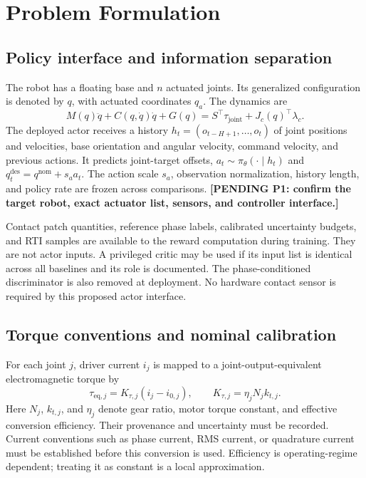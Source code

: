 \documentclass[11pt,a4paper]{article}
\newcommand{\pending}[1]{\textbf{[PENDING #1]}}
\begin{document}
\section{Problem Formulation}
\subsection{Policy interface and information separation}
The robot has a floating base and $n$ actuated joints. Its generalized configuration is denoted by $q$, with actuated coordinates $q_a$. The dynamics are
\begin{equation}
 M(q)\ddot q+C(q,\dot q)\dot q+G(q)=S^\top\tau_{\mathrm{joint}}+J_c(q)^\top\lambda_c .
\end{equation}
The deployed actor receives a history $h_t=(o_{t-H+1},\ldots,o_t)$ of joint positions and velocities, base orientation and angular velocity, command velocity, and previous actions. It predicts joint-target offsets, $a_t\sim\pi_\theta(\cdot\mid h_t)$ and $q_t^{\mathrm{des}}=q^{\mathrm{nom}}+s_a a_t$. The action scale $s_a$, observation normalization, history length, and policy rate are frozen across comparisons. \pending{P1: confirm the target robot, exact actuator list, sensors, and controller interface.}

Contact patch quantities, reference phase labels, calibrated uncertainty budgets, and RTI samples are available to the reward computation during training. They are not actor inputs. A privileged critic may be used if its input list is identical across all baselines and its role is documented. The phase-conditioned discriminator is also removed at deployment. No hardware contact sensor is required by this proposed actor interface.

\subsection{Torque conventions and nominal calibration}
For each joint $j$, driver current $i_j$ is mapped to a joint-output-equivalent electromagnetic torque by
\begin{equation}
 \tau_{\mathrm{eq},j}=K_{\tau,j}(i_j-i_{0,j}),\qquad K_{\tau,j}=\eta_j N_j k_{t,j}.
\end{equation}
Here $N_j$, $k_{t,j}$, and $\eta_j$ denote gear ratio, motor torque constant, and effective conversion efficiency. Their provenance and uncertainty must be recorded. Current conventions such as phase current, RMS current, or quadrature current must be established before this conversion is used. Efficiency is operating-regime dependent; treating it as constant is a local approximation.
\end{document}
